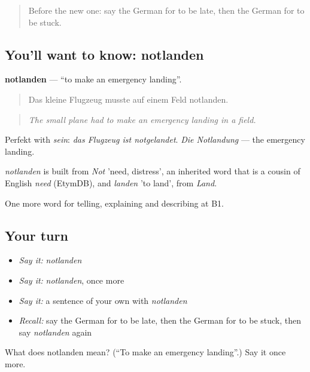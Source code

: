 \label{lesson:GE-C419-notlanden}



\begin{quote}
Before the new one: say the German for to be late, then the German for to be stuck.
\end{quote}

\subsection*{You'll want to know: notlanden}
\textbf{notlanden} — \textquotedblleft{}to make an emergency landing\textquotedblright{}.

\begin{quote}
Das kleine Flugzeug musste auf einem Feld notlanden.
\end{quote}

\begin{quote}
\emph{The small plane had to make an emergency landing in a field.}
\end{quote}

Perfekt with \emph{sein}: \emph{das Flugzeug ist notgelandet}. \emph{Die Notlandung} — the emergency landing.

\begin{cousinweb}
\emph{notlanden} is built from \emph{Not} 'need, distress', an inherited word that is a cousin of English \emph{need} (EtymDB), and \emph{landen} 'to land', from \emph{Land}.
\end{cousinweb}

\begin{grammarlens}[title={What you've built}]
One more word for telling, explaining and describing at B1.
\end{grammarlens}

\subsection*{Your turn}
\begin{itemize}
\raggedright
  \item \emph{Say it:} \emph{notlanden}
  \item \emph{Say it:} \emph{notlanden}, once more
  \item \emph{Say it:} a sentence of your own with \emph{notlanden}
  \item \emph{Recall:} say the German for to be late, then the German for to be stuck, then say \emph{notlanden} again
\end{itemize}

\begin{tcolorbox}[breakable,colback=teal!4,colframe=teal!35!black,title={Before you move on}]
What does notlanden mean? (\textquotedblleft{}To make an emergency landing\textquotedblright{}.) Say it once more.
\end{tcolorbox}
